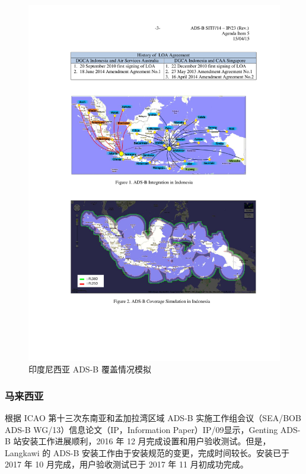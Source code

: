 \begin{figure}[!htb]
\centering
\includegraphics[width=14cm]{pic/Indonesia.pdf}
\caption{印度尼西亚 ADS-B 覆盖情况模拟\protect\footnotemark}
\label{fig:Indonesia}
\end{figure}


\subsubsection{马来西亚}

根据 ICAO 第十三次东南亚和孟加拉湾区域 ADS-B 实施工作组会议（SEA/BOB ADS-B WG/13）信息论文（IP，Information Paper）IP/09显示，Genting ADS-B 站安装工作进展顺利，2016 年 12 月完成设置和用户验收测试。但是，Langkawi 的 ADS-B 安装工作由于安装规范的变更，完成时间较长。安装已于 2017 年 10 月完成，用户验收测试已于 2017 年 11 月初成功完成。

